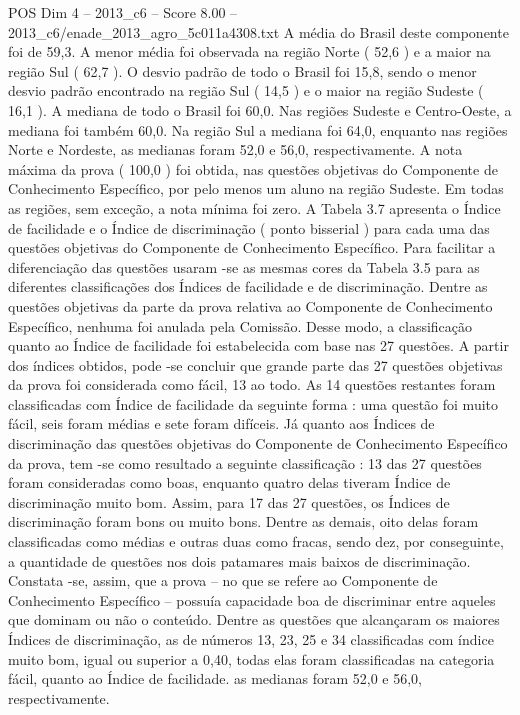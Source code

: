 \begin{textsample}{POS Dim 4 – 2013\_c6 – Score 8.00 – 2013\_c6/enade\_2013\_agro\_5c011a4308.txt}
A média do Brasil deste componente foi de 59,3.
A menor média foi observada na região Norte ( 52,6 ) e a maior na região Sul ( 62,7 ).
O desvio padrão de todo o Brasil foi 15,8, sendo o menor desvio padrão encontrado na região Sul ( 14,5 ) e o maior na região Sudeste ( 16,1 ).
A mediana de todo o Brasil foi 60,0.
Nas regiões Sudeste e Centro-Oeste, a mediana foi também 60,0.
Na região Sul a mediana foi 64,0, enquanto nas regiões Norte e Nordeste, as medianas foram 52,0 e 56,0, respectivamente.
A nota máxima da prova ( 100,0 ) foi obtida, nas questões objetivas do Componente de Conhecimento Específico, por pelo menos um aluno na região Sudeste.
Em todas as regiões, sem exceção, a nota mínima foi zero.
A Tabela 3.7 apresenta o Índice de facilidade e o Índice de discriminação ( ponto bisserial ) para cada uma das questões objetivas do Componente de Conhecimento Específico.
Para facilitar a diferenciação das questões usaram -se as mesmas cores da Tabela 3.5 para as diferentes classificações dos Índices de facilidade e de discriminação.
Dentre as questões objetivas da parte da prova relativa ao Componente de Conhecimento Específico, nenhuma foi anulada pela Comissão.
Desse modo, a classificação quanto ao Índice de facilidade foi estabelecida com base nas 27 questões.
A partir dos índices obtidos, pode -se concluir que grande parte das 27 questões objetivas da prova foi considerada como fácil, 13 ao todo.
As 14 questões restantes foram classificadas com Índice de facilidade da seguinte forma : uma questão foi muito fácil, seis foram médias e sete foram difíceis.
Já quanto aos Índices de discriminação das questões objetivas do Componente de Conhecimento Específico da prova, tem -se como resultado a seguinte classificação : 13 das 27 questões foram consideradas como boas, enquanto quatro delas tiveram Índice de discriminação muito bom.
Assim, para 17 das 27 questões, os Índices de discriminação foram bons ou muito bons.
Dentre as demais, oito delas foram classificadas como médias e outras duas como fracas, sendo dez, por conseguinte, a quantidade de questões nos dois patamares mais baixos de discriminação.
Constata -se, assim, que a prova – no que se refere ao Componente de Conhecimento Específico – possuía capacidade boa de discriminar entre aqueles que dominam ou não o conteúdo.
Dentre as questões que alcançaram os maiores Índices de discriminação, as de números 13, 23, 25 e 34 classificadas com índice muito bom, igual ou superior a 0,40, todas elas foram classificadas na categoria fácil, quanto ao Índice de facilidade. as medianas foram 52,0 e 56,0, respectivamente.

\end{textsample}
